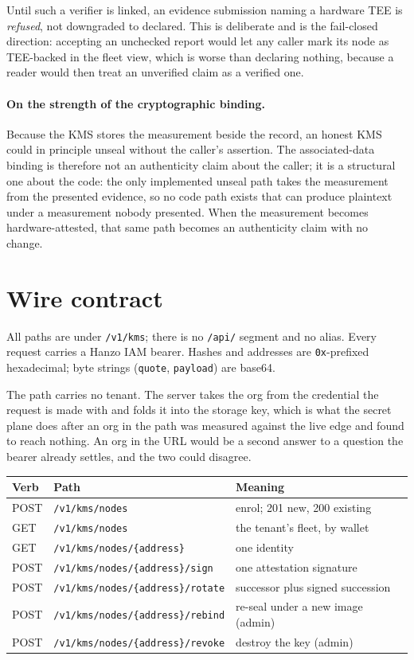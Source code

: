 \documentclass[11pt,a4paper]{article}
\newcommand{\code}[1]{\texttt{#1}}
\begin{document}
Until such a verifier is linked, an evidence submission naming a hardware TEE is
\emph{refused}, not downgraded to declared. This is deliberate and is the
fail-closed direction: accepting an unchecked report would let any caller mark
its node as TEE-backed in the fleet view, which is worse than declaring nothing,
because a reader would then treat an unverified claim as a verified one.

\paragraph{On the strength of the cryptographic binding.} Because the KMS stores
the measurement beside the record, an honest KMS could in principle unseal
without the caller's assertion. The associated-data binding is therefore not an
authenticity claim about the caller; it is a structural one about the code: the
only implemented unseal path takes the measurement from the presented evidence,
so no code path exists that can produce plaintext under a measurement nobody
presented. When the measurement becomes hardware-attested, that same path
becomes an authenticity claim with no change.

\section{Wire contract}

All paths are under \code{/v1/kms}; there is no \code{/api/} segment and no
alias. Every request carries a Hanzo IAM bearer. Hashes and addresses are
\code{0x}-prefixed hexadecimal; byte strings (\code{quote}, \code{payload}) are
base64.

The path carries no tenant. The server takes the org from the credential the
request is made with and folds it into the storage key, which is what the secret
plane does after an org in the path was measured against the live edge and found
to reach nothing. An org in the URL would be a second answer to a question the
bearer already settles, and the two could disagree.

\begin{longtable}{p{}p{}p{}}
\toprule
\textbf{Verb} & \textbf{Path} & \textbf{Meaning} \\
\midrule
\endhead
POST   & \code{/v1/kms/nodes}                    & enrol; 201 new, 200 existing \\
GET    & \code{/v1/kms/nodes}                    & the tenant's fleet, by wallet \\
GET    & \code{/v1/kms/nodes/\{address\}}        & one identity \\
POST   & \code{/v1/kms/nodes/\{address\}/sign}   & one attestation signature \\
POST   & \code{/v1/kms/nodes/\{address\}/rotate} & successor plus signed succession \\
POST   & \code{/v1/kms/nodes/\{address\}/rebind} & re-seal under a new image (admin) \\
POST   & \code{/v1/kms/nodes/\{address\}/revoke} & destroy the key (admin) \\
\bottomrule
\end{longtable}
\end{document}
